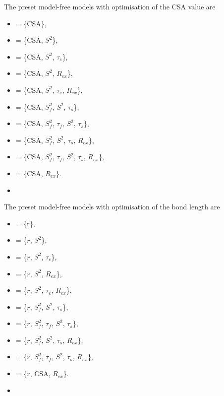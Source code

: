 The preset model-free models with optimisation of the CSA value are 
  

 \begin{itemize} 
 \item[]  = \{CSA\},  
 \item[]  = \{CSA, $S^2$\},  
 \item[]  = \{CSA, $S^2$, $\tau_e$\},  
 \item[]  = \{CSA, $S^2$, $R_{ex}$\},  
 \item[]  = \{CSA, $S^2$, $\tau_e$, $R_{ex}$\},  
 \item[]  = \{CSA, $S^2_f$, $S^2$, $\tau_s$\},  
 \item[]  = \{CSA, $S^2_f$, $\tau_f$, $S^2$, $\tau_s$\},  
 \item[]  = \{CSA, $S^2_f$, $S^2$, $\tau_s$, $R_{ex}$\},  
 \item[]  = \{CSA, $S^2_f$, $\tau_f$, $S^2$, $\tau_s$, $R_{ex}$\},  
 \item[]  = \{CSA, $R_{ex}$\}.  
 \item[]  
 \end{itemize} 
  

 The preset model-free models with optimisation of the bond length are 
  

 \begin{itemize} 
 \item[]  = \{r\},  
 \item[]  = \{$r$, $S^2$\},  
 \item[]  = \{$r$, $S^2$, $\tau_e$\},  
 \item[]  = \{$r$, $S^2$, $R_{ex}$\},  
 \item[]  = \{$r$, $S^2$, $\tau_e$, $R_{ex}$\},  
 \item[]  = \{$r$, $S^2_f$, $S^2$, $\tau_s$\},  
 \item[]  = \{$r$, $S^2_f$, $\tau_f$, $S^2$, $\tau_s$\},  
 \item[]  = \{$r$, $S^2_f$, $S^2$, $\tau_s$, $R_{ex}$\},  
 \item[]  = \{$r$, $S^2_f$, $\tau_f$, $S^2$, $\tau_s$, $R_{ex}$\},  
 \item[]  = \{$r$, CSA, $R_{ex}$\}.  
 \item[]  
 \end{itemize} 
  

